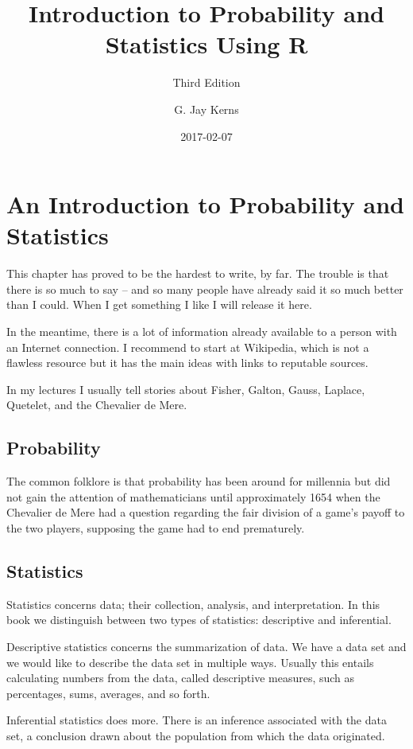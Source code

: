 \documentclass[]{book}
\title{Introduction to Probability and Statistics Using R}
\author{G. Jay Kerns}
\date{2017-02-07}
\subtitle{Third Edition}
\numberwithin{equation}{chapter}
\numberwithin{figure}{chapter}
\theoremstyle{plain}
\theoremstyle{definition}
\theoremstyle{remark}
\theoremstyle{definition}
\theoremstyle{definition}
\theoremstyle{remark}
\begin{document}
\maketitle

{
\setcounter{tocdepth}{1}
\tableofcontents
}
\chapter{An Introduction to Probability and
Statistics}\label{cha-introps}

This chapter has proved to be the hardest to write, by far. The trouble
is that there is so much to say -- and so many people have already said
it so much better than I could. When I get something I like I will
release it here.

In the meantime, there is a lot of information already available to a
person with an Internet connection. I recommend to start at Wikipedia,
which is not a flawless resource but it has the main ideas with links to
reputable sources.

In my lectures I usually tell stories about Fisher, Galton, Gauss,
Laplace, Quetelet, and the Chevalier de Mere.

\section{Probability}\label{probability}

The common folklore is that probability has been around for millennia
but did not gain the attention of mathematicians until approximately
1654 when the Chevalier de Mere had a question regarding the fair
division of a game's payoff to the two players, supposing the game had
to end prematurely.

\section{Statistics}\label{statistics}

Statistics concerns data; their collection, analysis, and
interpretation. In this book we distinguish between two types of
statistics: descriptive and inferential.

Descriptive statistics concerns the summarization of data. We have a
data set and we would like to describe the data set in multiple ways.
Usually this entails calculating numbers from the data, called
descriptive measures, such as percentages, sums, averages, and so forth.

Inferential statistics does more. There is an inference associated with
the data set, a conclusion drawn about the population from which the
data originated.
\end{document}
